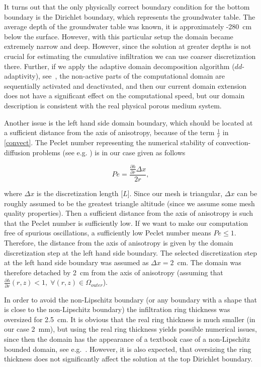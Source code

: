 \documentclass[review]{elsarticle}
\newenvironment{lineq}
    {\begin{linenomath*}
    \begin{equation}
    }
    { 
    \end{equation} 
    \end{linenomath*}
    }
\begin{document}
It turns out that the only physically correct boundary condition for the bottom boundary is the Dirichlet boundary, which represents the groundwater table. The average depth of the groundwater table was known, it is approximately -280~cm below the surface. However, with this particular setup the domain became extremely narrow and deep. However, since the solution at greater depths
is not crucial for estimating the cumulative infiltration we can use coarser  discretization there. Further, if we apply the   adaptive domain decomposition algorithm ($dd$-adaptivity), see~\citep{mojecomp, mojejcam2, mojeamc2},  the non-active parts of the computational domain are sequentially activated and deactivated, and then our current domain extension does not have a significant effect on the computational speed, but our domain  description is consistent with the real physical porous medium system.


Another issue is the left hand side domain boundary, which should be located at a sufficient distance from the axis of anisotropy, because of the term $\frac{1}{r}$ in \eqref{convect}. The Peclet number representing the numerical stability of convection-diffusion problems (see e.g. \citep{Knobloch2008}) is in our case given as follows
\begin{lineq}
Pe = \frac{\frac{\partial h}{\partial r} \Delta x}{2r},
\end{lineq}
where $\Delta x$ is the discretization length [$L$]. Since our mesh is triangular,  $\Delta x$ can be roughly assumed to be the greatest triangle altitude (since we assume some mesh quality properties). Then a sufficient distance from the axis of anisotropy is such that the Peclet number is sufficiently low. If we want to make our computation free of spurious oscillations, a sufficiently low Peclet number means $Pe\le 1$. Therefore, the distance from the axis of anisotropy is given by the domain discretization step at the left hand side boundary.  The selected discretization step at the left hand side boundary was assumed as $\Delta x=2$~cm. The domain was therefore detached by 2~cm from the axis of anisotropy (assuming that $\frac{\partial h}{\partial r} (r,z) < 1, \; \forall (r,z) \in \Omega_{outer}$).

In order to avoid the non-Lipschitz boundary (or any boundary with a shape that is close to the non-Lipschitz boundary) the infiltration ring thickness was oversized  for 2.5~cm. It is obvious that the real ring thickness is much smaller (in our case 2~mm), but using the real ring  thickness yields possible numerical issues, since then the domain has the appearance of a textbook case of  a non-Lipschitz bounded domain,  {see e.g.~\citep{fem}}.  However, it is also expected, that oversizing the ring thickness does not significantly affect the solution at the top Dirichlet boundary. 
\end{document}
